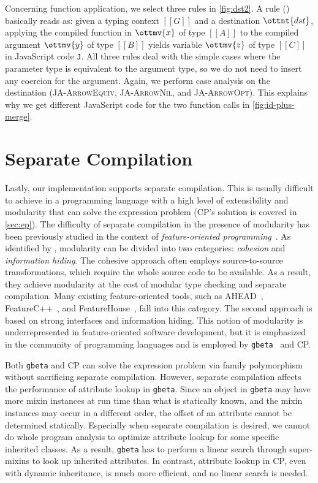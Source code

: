 Concerning function application, we select three rules in \autoref{fig:dst2}. A
rule (\application) basically reads as: given a typing context $[[G]]$ and a
destination $\ottnt{dst}$, applying the compiled function in $\ottmv{x}$ of type
$[[A]]$ to the compiled argument $\ottmv{y}$ of type $[[B]]$ yields variable
$\ottmv{z}$ of type $[[C]]$ in JavaScript code \texttt{J}. All three rules deal
with the simple cases where the parameter type is equivalent to the argument
type, so we do not need to insert any coercion for the argument. Again, we
perform case analysis on the destination (\textsc{JA-ArrowEquiv},
\textsc{JA-ArrowNil}, and \textsc{JA-ArrowOpt}). This explains why we get
different JavaScript code for the two function calls in
\autoref{fig:id-plus-merge}.

\section{Separate Compilation} \label{sec:separate}

Lastly, our implementation supports separate compilation. This is usually
difficult to achieve in a programming language with a high level of
extensibility and modularity that can solve the expression problem (CP's
solution is covered in \autoref{sec:ep}). The difficulty of separate compilation
in the presence of modularity has been previously studied in the context of
\emph{feature-oriented
programming}~\citep{prehofer1997feature,apel2009overview}. As identified by
\citet{kastner2011road}, modularity can be divided into two categories:
\emph{cohesion} and \emph{information hiding}. The cohesive approach often
employs source-to-source transformations, which require the whole source code to
be available. As a result, they achieve modularity at the cost of modular type
checking and separate compilation. Many existing feature-oriented tools, such as
AHEAD~\citep{batory2004scaling}, FeatureC++~\citep{apel2005featurec++}, and
FeatureHouse~\citep{apel2013language}, fall into this category. The second
approach is based on strong interfaces and information hiding. This notion of
modularity is underrepresented in feature-oriented software development, but it
is emphasized in the community of programming languages and is employed by
\texttt{gbeta}~\citep{ernst2000gbeta} and CP.

Both \texttt{gbeta} and CP can solve the expression problem via family
polymorphism~\citep{ernst2004expression} without sacrificing separate
compilation. However, separate compilation affects the performance of attribute
lookup in \texttt{gbeta}. Since an object in \texttt{gbeta} may have more mixin
instances at run time than what is statically known, and the mixin instances may
occur in a different order, the offset of an attribute cannot be determined
statically. Especially when separate compilation is desired, we cannot do whole
program analysis to optimize attribute lookup for some specific inherited
classes. As a result, \texttt{gbeta} has to perform a linear search through
super-mixins to look up inherited attributes. In contrast, attribute lookup in
CP, even with dynamic inheritance, is much more efficient, and no linear search
is needed.


